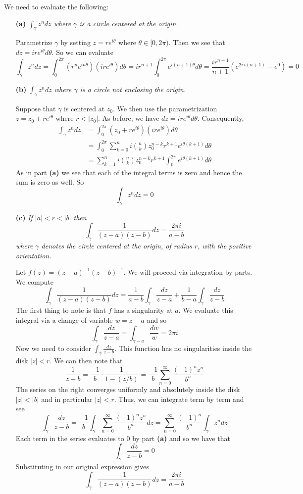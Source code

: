 \documentclass{article}
\newcommand{\exercise}[1]{\noindent{\textbf{Exercise #1:}}}
\begin{document}
\exercise{1.4.25}
We need to evaluate the following:
\begin{enumerate}
\item[\textbf{(a)}] \textit{$\int_\gamma z^ndz$ where $\gamma$ is a circle
  centered at the origin.}

Parametrize $\gamma$ by setting $z = re^{i\theta}$ where $\theta \in
[0,2\pi)$. Then we see that $dz = ire^{i\theta}d\theta$. So we can evaluate
\[
\int_\gamma z^ndz =
\int_0^{2\pi}(r^ne^{in\theta})(ire^{i\theta})d\theta =
ir^{n+1}\int_0^{2\pi}e^{i(n+1)\theta}d\theta =
\frac{ir^{n+1}}{n+1}(e^{2\pi i(n+1)} - e^0) = 0
\]

\item[\textbf{(b)}] \textit{$\int_\gamma z^ndz$ where $\gamma$ is a circle
  not enclosing the origin.}

Suppose that $\gamma$ is centered at $z_0$. We then use the
parametrization $z = z_0 + re^{i\theta}$ where $r < |z_0|$. As before,
we have $dz = ire^{i\theta}d\theta$. Consequently,
\begin{align*}
  \int_\gamma z^ndz &= \int_0^{2\pi}(z_0 + re^{i\theta})(ire^{i\theta})d\theta\\
  &= \int_0^{2\pi} \sum_{k=0}^n
  i\binom{n}{k}z_0^{n-k}r^{k+1}e^{i\theta(k+1)}d\theta \\
  &= \sum_{k=1}^ni\binom{n}{k}z_0^{n-k}r^{k+1}\int_0^{2\pi}
  e^{i\theta(k+1)}d\theta
\end{align*}
As in part \textbf{(a)} we see that each of the integral terms is zero
and hence the sum is zero as well. So
\[
\int_\gamma z^ndz = 0
\]

\item[\textbf{(c)}] \textit{If $|a| < r < |b|$ then}
\[
\int_\gamma \frac{1}{(z-a)(z-b)}dz = \frac{2\pi i}{a - b}
\]
\textit{where $\gamma$ denotes the circle centered at the origin, of
  radius $r$, with the positive orientation.}

Let $f(z) = (z-a)^{-1}(z-b)^{-1}$. We will proceed via integration by
parts. We compute
\[
\int_\gamma \frac{1}{(z-a)(z-b)}dz = \frac{1}{a-b}\int_\gamma
\frac{dz}{z-a} + \frac{1}{b-a}\int_\gamma \frac{dz}{z - b}
\]
The first thing to note is that $f$ has a singularity at $a$. We
evaluate this integral via a change of variable $w = z - a$ and so
\[
\int_\gamma\frac{dz}{z-a} = \int_{\gamma - a} \frac{dw}{w} = 2\pi i
\]
Now we need to consider $\int_\gamma \frac{dz}{z-b}$. This function
has no singularities inside the disk $|z| < r$. We can then note that
\[
\frac{1}{z-b} = \frac{-1}{b}\cdot\frac{1}{1-(z/b)} =
\frac{-1}{b}\sum_{n=0}^\infty \frac{(-1)^nz^n}{b^n}
\]
The series on the right converges uniformly and absolutely inside the
disk $|z| < |b|$ and in particular $|z| < r$. Thus, we can integrate term
by term and see
\[
\int_\gamma \frac{dz}{z-b} = \frac{-1}{b}\int_\gamma \sum_{n=0}^\infty
\frac{(-1)^nz^n}{b^n}dz = \sum_{n=0}^\infty \frac{(-1)^n}{b^n}\int_\gamma z^ndz
\]
Each term in the series evaluates to 0 by part \textbf{(a)} and so we
have that
\[
\int_\gamma \frac{dz}{z-b} = 0
\]
Substituting in our original expression gives
\[
\int_\gamma \frac{1}{(z-a)(z-b)}dz = \frac{2\pi i}{a - b}
\]
\end{enumerate}
\end{document}

